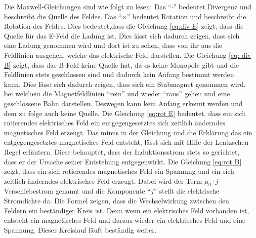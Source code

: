 Die Maxwell-Gleichungen sind wie folgt zu lesen: 
Das "`$\cdot$"' bedeutet Divergenz und beschreibt die Quelle des Feldes.
Das "`$\times$"' bedeutet Rotation und beschreibt die Rotation des Feldes.
Dies bedeutet,dass die Gleichung \ref{eq:div E} zeigt, dass die Quelle für das E-Feld die Ladung ist.
Dies lässt sich dadurch zeigen, dass sich eine Ladung genommen wird und dort ist zu sehen, dass von ihr aus die Feldlinien ausgehen, welche das elektrische Feld darstellen.
Die Gleichung \ref{eq: div B} zeigt, dass das B-Feld keine Quelle hat, da es keine Monopole gibt und die Feldlinien stets geschlossen sind und dadurch kein Anfang bestimmt werden kann.
Dies lässt sich dadurch zeigen, dass sich ein Stabmagnet genommen wird, bei welchem die Magnetfeldlinien "`rein"' und wieder "`raus"' gehen und eine geschlossene Bahn darstellen.
Deswegen kann kein Anfang erkennt werden und dem zu folge auch keine Quelle.
Die Gleichung \ref{eq:rot E} bedeutet, dass ein sich rotierendes elektrisches Feld ein entgegengesetztes sich zeitlich änderndes magnetisches Feld erzeugt.
Das minus in der Gleichung und die Erklärung das ein entgegengesetztes magnetisches Feld entsteht, lässt sich mit Hilfe der Lentzschen Regel erläutern.
Diese behauptet, dass der Induktionsstrom stets so gerichtet, dass er der Ursache seiner Entstehung entgegenwirkt.
Die Gleichung \ref{eq:rot B} zeigt, dass ein sich rotierendes magnetisches Feld ein Spannung und ein sich zeitlich änderndes elektrisches Feld erzeugt.
Dabei wird der Term $\mu_0 \cdot j$ Verschiebestrom genannt und die Komponente "`$j$"' stellt die elektrische Stromdichte da.
Die Formel zeigen, dass die Wechselwirkung zwischen den Feldern ein beständiger Kreis ist. 
Denn wenn ein elektrisches Feld vorhanden ist, entsteht ein magnetisches Feld und daraus wieder ein elektrisches Feld und eine Spannung.
Dieser Kreislauf läuft beständig weiter.